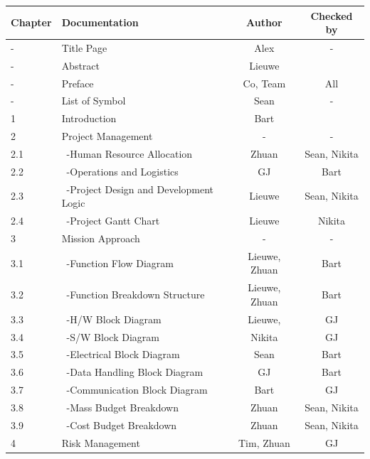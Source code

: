 \newpage
\begin{center}
\begin{longtable}{|l|l|c|c|}\hline
 Chapter & Documentation                      & Author & Checked by \\\hline\hline
 -       & Title Page                           & Alex & - \\\hline     -       & Abstract                             & Lieuwe & \\\hline    
 -       & Preface                              & Co, Team& All \\\hline
 -       & List of Symbol                       & Sean & - \\\hline\hline
 1       & Introduction                         & Bart &\\\hline\hline
 2       & Project Management                   & - & -\\\hline
 2.1     & \ -Human Resource Allocation         & Zhuan & Sean, Nikita \\\hline
 2.2     & \ -Operations and Logistics          & GJ & Bart \\\hline
 2.3     & \ -Project Design and Development Logic & Lieuwe & Sean, Nikita \\\hline
 2.4     & \ -Project Gantt Chart               & Lieuwe & Nikita \\\hline\hline
 3       & Mission Approach                     & - & -\\\hline
 3.1     & \ -Function Flow Diagram             & Lieuwe, Zhuan & Bart \\\hline
 3.2     & \ -Function Breakdown Structure      & Lieuwe, Zhuan & Bart \\\hline
 3.3     & \ -H/W Block Diagram                 & Lieuwe, & GJ \\\hline
 3.4     & \ -S/W Block Diagram                 & Nikita & GJ \\\hline
 3.5     & \ -Electrical Block Diagram          & Sean & Bart \\\hline
 3.6     & \ -Data Handling Block Diagram       & GJ & Bart\\\hline
 3.7     & \ -Communication Block Diagram       & Bart & GJ\\\hline
 3.8     & \ -Mass Budget Breakdown             & Zhuan & Sean, Nikita \\\hline
 3.9     & \ -Cost Budget Breakdown             & Zhuan & Sean, Nikita \\\hline\hline
 4       & Risk Management                      & Tim, Zhuan & GJ \\\hline\hline

\end{longtable}
\end{center}
